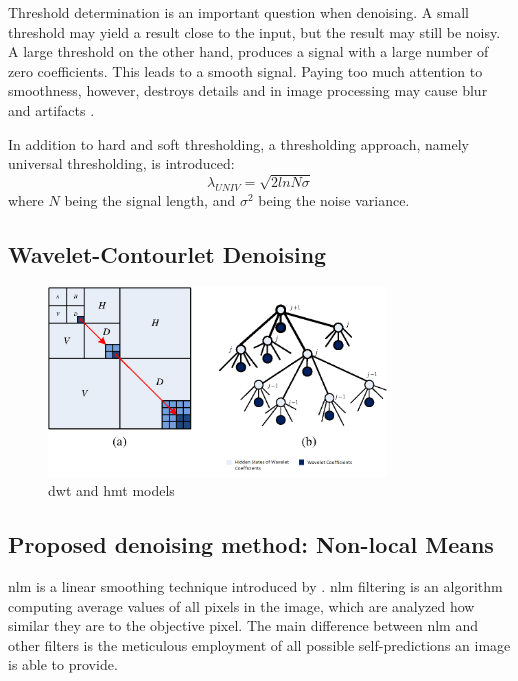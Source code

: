 Threshold determination is an important question when denoising. A small threshold
may yield a result close to the input, but the
result may still be noisy. A large threshold on the other hand, produces a signal with a large number
of zero coefficients. This leads to a smooth signal.
Paying too much attention to smoothness, however,
destroys details and in image processing may cause
blur and artifacts \cite{rangarajan2002image}.

In addition to hard and soft thresholding, a thresholding approach, namely universal thresholding, is introduced:
\begin{equation}
\lambda_{UNIV}=\sqrt{2lnN\sigma}
\end{equation}
where $N$ being the signal length, and $\sigma^2$ being the noise variance.


\subsection{Wavelet-Contourlet Denoising}

\begin{figure}[h]
	\centering
	\includegraphics[width=0.8\textwidth]{fig/wavelets_hmt}
	\caption{\glsdesc{dwt} and \glsdesc{hmt} models}
	\label{fig:wavelets_hmt}
\end{figure}


\subsection{Proposed denoising method: Non-local Means}

\gls{nlm} is a linear smoothing technique introduced by \citeauthor{buades2005non}. \gls{nlm} filtering
is an algorithm computing average values of all pixels in the image, which are analyzed
how similar they are to the objective pixel. The main difference between \gls{nlm} and other filters is the meticulous employment of all possible self-predictions
an image is able to provide.


